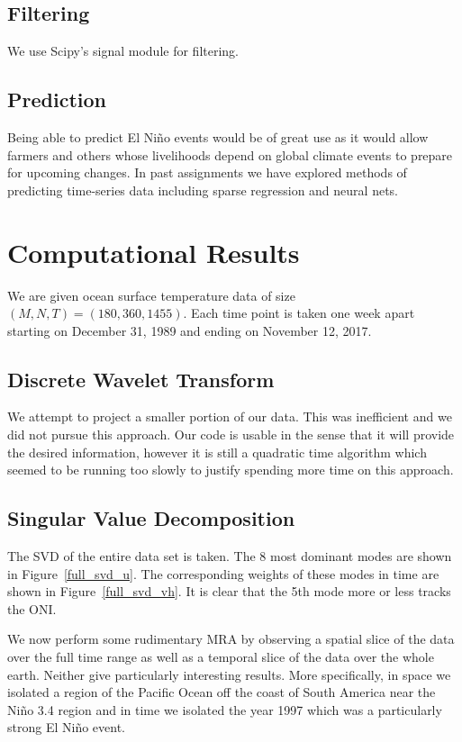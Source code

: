 \documentclass[10pt]{article}
\begin{document}
\subsection{Filtering}
We use Scipy's signal module for filtering.

\subsection{Prediction}
Being able to predict El Ni\~no events would be of great use as it would allow farmers and others whose livelihoods depend on global climate events to prepare for upcoming changes. In past assignments we have explored methods of predicting time-series data including sparse regression and neural nets.

\section{Computational Results}
We are given ocean surface temperature data of size \( (M,N,T) = (180,360,1455) \). Each time point is taken one week apart starting on December 31, 1989 and ending on November 12, 2017.

\subsection{Discrete Wavelet Transform}
We attempt to project a smaller portion of our data. This was inefficient and we did not pursue this approach. Our code is usable in the sense that it will provide the desired information, however it is still a quadratic time algorithm which seemed to be running too slowly to justify spending more time on this approach.

\subsection{Singular Value Decomposition}
The SVD of the entire data set is taken. The 8 most dominant modes are shown in Figure~\ref{full_svd_u}. The corresponding weights of these modes in time are shown in Figure~\ref{full_svd_vh}. It is clear that the 5th mode more or less tracks the ONI.

We now perform some rudimentary MRA by observing a spatial slice of the data over the full time range as well as a temporal slice of the data over the whole earth. Neither give particularly interesting results. More specifically, in space we isolated a region of the Pacific Ocean off the coast of South America near the Ni\~no 3.4 region and in time we isolated the year 1997 which was a particularly strong El Ni\~no event.
\end{document}
